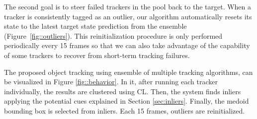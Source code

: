 The second goal is to steer failed trackers in the pool back to the target.
When a tracker is consistently tagged as an outlier, our algorithm automatically
resets its state to the latest target state prediction from the ensemble
(Figure~\ref{fig::outliers}).
This reinitialization procedure is only performed periodically every 15 frames
so that we can also take advantage of the capability of some trackers
to recover from short-term tracking failures.

The proposed object tracking using ensemble of multiple tracking algorithms, can be visualized in Figure \ref{fig::behavior}. In it, after running each tracker
individually, the results are clustered using CL. Then, the system finds inliers
applying the potential cues explained in Section \ref{sec:inliers}. Finally, the
medoid bounding box is selected from inliers. Each 15 frames, outliers are
reinitialized.


